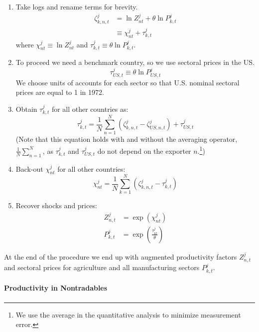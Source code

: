 \documentclass[12pt]{article}
\begin{document}
\begin{enumerate}
\item Take logs and rename terms for brevity. 
\begin{align}
\zeta _{k,n,t}^{j}& =\ln {Z_{nt}^{j}}+\theta \ln {P_{k,t}^{j}} \\
& \equiv \chi _{nt}^{j}+\tau _{k,t}^{j}
\end{align}%
where $\chi _{nt}^{j}\equiv \ln {Z_{nt}^{j}}$ and $\tau _{k,t}^{j}\equiv
\theta \ln {P_{k,t}^{j}}$.

\item To proceed we need a benchmark country, so we use sectoral prices in
the US. 
\begin{equation*}
\tau _{US,t}^{j}\equiv \theta \ln {P_{US,t}^{j}}
\end{equation*}%
We choose units of accounts for each sector so that U.S. nominal sectoral
prices are equal to 1 in 1972.

\item Obtain $\tau _{k,t}^{j}$ for all other countries as: 
\begin{equation}
\tau _{k,t}^{j}=\frac{1}{N}\sum_{n=1}^{N}\left( \zeta _{k,n,t}^{j}-\zeta
_{US,n,t}^{j}\right) +\tau _{US,t}^{j}
\end{equation}%
(Note that this equation holds with and without the averaging operator, $%
\frac{1}{N}\sum_{n=1}^{N}$, as $\tau _{k,t}^{j}$ and $\tau _{US,t}^{j}$ do
not depend on the exporter $n$.\footnote{%
We use the average in the quantitative analysis to minimize measurement
error.})

\item Back-out $\chi _{nt}^{j}$ for all other countries:%
\begin{equation}
\chi _{nt}^{j}=\frac{1}{N}\sum_{k=1}^{N}\left( \zeta _{k,n,t}^{j}-\tau
_{k,t}^{j}\right)
\end{equation}

\item Recover shocks and prices:%
\begin{align}
Z_{n,t}^{j}& =\exp \left( \chi _{nt}^{j}\right) \\
P_{k,t}^{j}& =\exp \left( \frac{\tau _{kt}^{j}}{\theta }\right)
\end{align}
\end{enumerate}

At the end of the procedure we end up with augmented productivity factors $%
Z_{n,t}^{j}$ and sectoral prices for agriculture and all manufacturing
sectors $P_{k,t}^{j}$.

\paragraph{Productivity in Nontradables}
\end{document}
